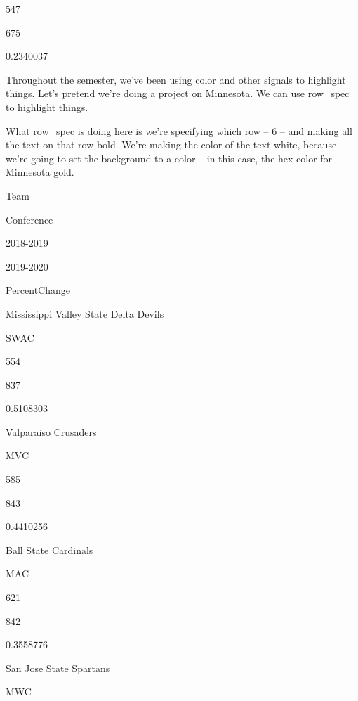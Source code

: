 \documentclass[
]{book}
\newenvironment{Shaded}{\begin{snugshade}}{\end{snugshade}}
\newcommand{\DataTypeTok}[1]{\textcolor[rgb]{0.13,0.29,0.53}{#1}}
\newcommand{\DecValTok}[1]{\textcolor[rgb]{0.00,0.00,0.81}{#1}}
\newcommand{\KeywordTok}[1]{\textcolor[rgb]{0.13,0.29,0.53}{\textbf{#1}}}
\newcommand{\NormalTok}[1]{#1}
\newcommand{\OperatorTok}[1]{\textcolor[rgb]{0.81,0.36,0.00}{\textbf{#1}}}
\newcommand{\StringTok}[1]{\textcolor[rgb]{0.31,0.60,0.02}{#1}}
\begin{document}
547

675

0.2340037

Throughout the semester, we've been using color and other signals to highlight things. Let's pretend we're doing a project on Minnesota. We can use row\_spec to highlight things.

What row\_spec is doing here is we're specifying which row -- 6 -- and making all the text on that row bold. We're making the color of the text white, because we're going to set the background to a color -- in this case, the hex color for Minnesota gold.

\begin{Shaded}
\end{Shaded}

Team

Conference

2018-2019

2019-2020

PercentChange

Mississippi Valley State Delta Devils

SWAC

554

837

0.5108303

Valparaiso Crusaders

MVC

585

843

0.4410256

Ball State Cardinals

MAC

621

842

0.3558776

San Jose State Spartans

MWC
\end{document}
